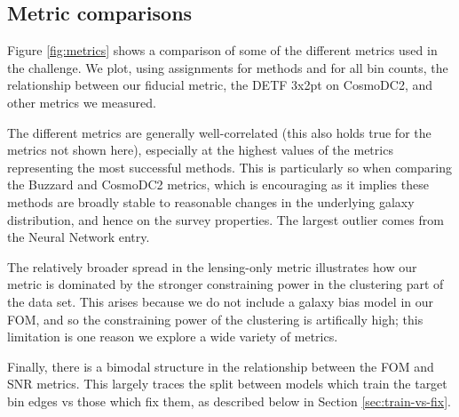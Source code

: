 \documentclass[twocolumn,twocolappendix]{aastex63}
\begin{document}
\subsection{Metric comparisons} \label{sec:metric-results}
Figure \ref{fig:metrics} shows a comparison of some of the different metrics used in the challenge.
We plot, using assignments for methods and for all bin counts, the relationship between our fiducial
metric, the DETF 3x2pt on CosmoDC2, and other metrics we measured.

The different metrics are generally well-correlated (this also holds true for the metrics not 
shown here), especially at the highest values of the metrics representing the most successful
methods. This is particularly so when comparing the Buzzard and CosmoDC2 metrics, which is encouraging 
as it implies these methods are broadly stable to reasonable changes in the underlying galaxy
distribution, and hence on the survey properties.  The largest outlier comes from the 
{\sc Neural Network} entry.

The relatively broader spread in the lensing-only metric illustrates how our metric is dominated
by the stronger constraining power in the clustering part of the data set.  This arises because
we do not include a galaxy bias model in our FOM, and so the constraining power of the clustering
is artifically high; this limitation is one reason we explore a wide variety of metrics.

Finally, there is a bimodal structure in the relationship between the FOM and SNR metrics.
This largely traces the split between models which train the target bin edges vs those
which fix them, as described below in Section \ref{sec:train-vs-fix}.
\end{document}

